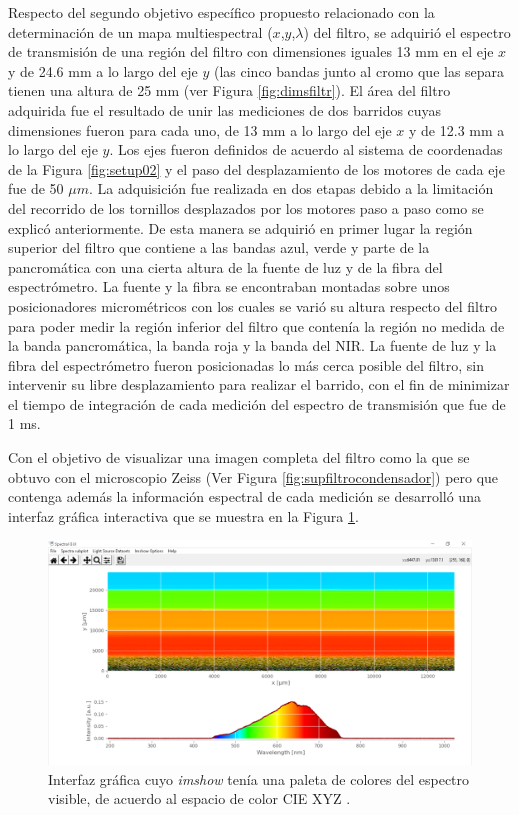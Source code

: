 Respecto del segundo objetivo específico propuesto relacionado con la determinación de un mapa multiespectral ($\textit{x}$,$\textit{y}$,$\lambda$) del filtro, se adquirió el espectro de transmisión de una región del filtro con dimensiones iguales 13 mm en el eje $\textit{x}$ y de 24.6 mm a lo largo del eje $\textit{y}$ (las cinco bandas junto al cromo que las separa tienen una altura de 25 mm (ver Figura \ref{fig:dimsfiltr}). El área del filtro adquirida fue el resultado de unir las mediciones de dos barridos cuyas dimensiones fueron para cada uno, de 13 mm a lo largo del eje $\textit{x}$ y de 12.3 mm a lo largo del eje $\textit{y}$. Los ejes fueron definidos de acuerdo al sistema de coordenadas de la Figura \ref{fig:setup02} y el paso del desplazamiento de los motores de cada eje fue de 50 $\mu m$. La adquisición fue realizada en dos etapas debido a la limitación del recorrido de los tornillos desplazados por los motores paso a paso como se explicó anteriormente. De esta manera se adquirió en primer lugar la región superior del filtro que contiene a las bandas azul, verde y parte de la pancromática con una cierta altura de la fuente de luz y de la fibra del espectrómetro. La fuente y la fibra se encontraban montadas sobre unos posicionadores micrométricos con los cuales se varió su altura respecto del filtro para poder medir la región inferior del filtro que contenía la región no medida de la banda pancromática, la banda roja y la banda del NIR. La fuente de luz y la fibra del espectrómetro fueron posicionadas lo más cerca posible del filtro, sin intervenir su libre desplazamiento para realizar el barrido, con el fin de minimizar el tiempo de integración de cada medición del espectro de transmisión que fue de 1 ms.

Con el objetivo de visualizar una imagen completa del filtro como la que se obtuvo con el microscopio Zeiss (Ver Figura \ref{fig:supfiltrocondensador}) pero que contenga además la información espectral de cada medición se desarrolló una interfaz gráfica interactiva que se muestra en la Figura \ref{fig:GUI00}.

\begin{figure}[H]
	\centering
	\includegraphics[width=1.0\textwidth]{Figs/microespectrometro/guirgb.png}
	\caption{Interfaz gráfica cuyo \textit{imshow} tenía una paleta de colores del espectro visible, de acuerdo al espacio de color CIE XYZ \cite{Wyman}.}
	\label{fig:GUI00}
\end{figure}


